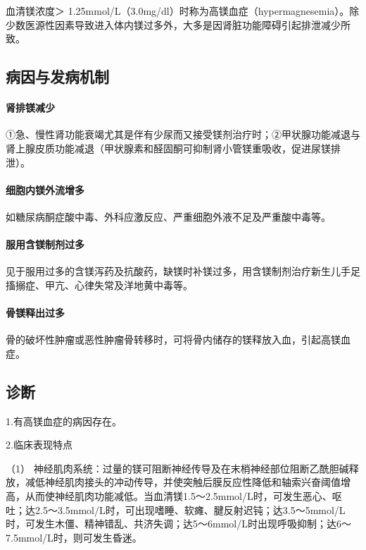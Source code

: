 血清镁浓度＞
1.25mmol/L（3.0mg/dl）时称为高镁血症（hypermagnesemia）。除少数医源性因素导致进入体内镁过多外，大多是因肾脏功能障碍引起排泄减少所致。

\subsection{病因与发病机制}

\paragraph{肾排镁减少}

①急、慢性肾功能衰竭尤其是伴有少尿而又接受镁剂治疗时；②甲状腺功能减退与肾上腺皮质功能减退（甲状腺素和醛固酮可抑制肾小管镁重吸收，促进尿镁排泄）。

\paragraph{细胞内镁外流增多}

如糖尿病酮症酸中毒、外科应激反应、严重细胞外液不足及严重酸中毒等。

\paragraph{服用含镁制剂过多}

见于服用过多的含镁泻药及抗酸药，缺镁时补镁过多，用含镁制剂治疗新生儿手足搐搦症、甲亢、心律失常及洋地黄中毒等。

\paragraph{骨镁释出过多}

骨的破坏性肿瘤或恶性肿瘤骨转移时，可将骨内储存的镁释放入血，引起高镁血症。

\subsection{诊断}

1.有高镁血症的病因存在。

2.临床表现特点

（1）
神经肌肉系统：过量的镁可阻断神经传导及在末梢神经部位阻断乙酰胆碱释放，减低神经肌肉接头的冲动传导，并使突触后膜反应性降低和轴索兴奋阈值增高，从而使神经肌肉功能减低。当血清镁1.5～2.5mmol/L时，可发生恶心、呕吐；达2.5～3.5mmol/L时，可出现嗜睡、软瘫、腱反射迟钝；达3.5～5mmol/L时，可发生木僵、精神错乱、共济失调；达5～6mmol/L时出现呼吸抑制；达6～7.5mmol/L时，则可发生昏迷。

